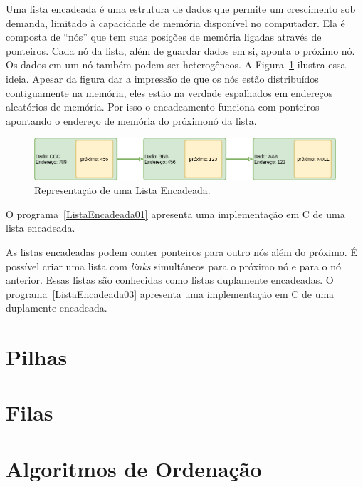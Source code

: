 \documentclass[11pt,fleqn]{book} %
\begin{document}
Uma lista encadeada é uma estrutura de dados que permite um crescimento sob demanda, limitado à capacidade de memória disponível no computador.
Ela é composta de ``nós'' que tem suas posições de memória ligadas através de ponteiros. 
Cada nó da lista, além de guardar dados em si, aponta o próximo nó.
Os dados em um nó também podem ser heterogêneos.
A Figura~\ref{listaEncadeada} ilustra essa ideia. 
Apesar da figura dar a impressão de que os nós estão distribuídos contiguamente na memória, eles estão na verdade espalhados em endereços aleatórios de memória. 
Por isso o encadeamento funciona com ponteiros apontando o endereço de memória do próximonó da lista.
\begin{figure}
	\centering
	\includegraphics[width=.7\textwidth]{Pictures/ListaEncadeada01.png}
	\caption[Lista Encadeada]{Representação de uma Lista Encadeada.}
	\label{listaEncadeada}
\end{figure}
O  programa~\ref{ListaEncadeada01} apresenta uma implementação em C de uma lista encadeada.
\newpage
\label{ListaEncadeada01}

\newpage
As listas encadeadas podem conter ponteiros para outro nós além do próximo. 
É possível criar uma lista com \textit{links} simultâneos para o próximo nó e para o nó anterior.
Essas listas são conhecidas como listas duplamente encadeadas.
O  programa~\ref{ListaEncadeada03} apresenta uma implementação em C de uma duplamente encadeada.

\label{ListaEncadeada03}

\section{Pilhas}\label{pilhas}

\section{Filas}\label{filas}

\section{Algoritmos de Ordenação}\label{ordenacao}
\end{document}
